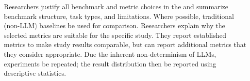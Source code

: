 Researchers \must justify all benchmark and metric choices in the \paper and \should summarize benchmark structure, task types, and limitations. Where possible, traditional (non-LLM) baselines \should be used for comparison. Researchers \must explain why the selected metrics are suitable for the specific study. They \should report established metrics to make study results comparable, but can report additional metrics that they consider appropriate. Due the inherent non-determinism of LLMs, experiments \should be repeated; the result distribution \should then be reported using descriptive statistics.